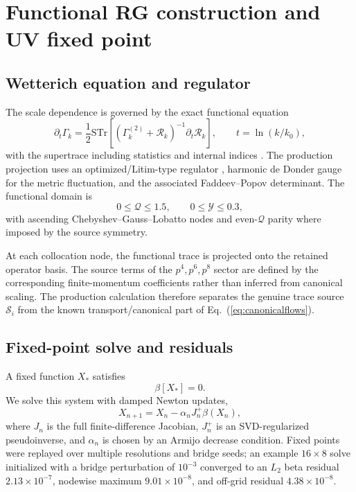 \documentclass[12pt]{iopart}
\newcommand{\STr}{\mathrm{STr}}
\newcommand{\cR}{\mathcal R}
\newcommand{\cS}{\mathcal S}
\newcommand{\Q}{\mathcal Q}
\newcommand{\Y}{\mathcal Y}
\begin{document}
\section{Functional RG construction and UV fixed point}
\label{sec:frg}

\subsection{Wetterich equation and regulator}

The scale dependence is governed by the exact functional equation
\begin{equation}
\partial_t\Gamma_k=\frac12\STr\left[
\left(\Gamma_k^{(2)}+\cR_k\right)^{-1}\partial_t\cR_k
\right],\qquad t=\ln(k/k_0),
\label{eq:wetterich}
\end{equation}
with the supertrace including statistics and internal indices \cite{Wetterich1993,Reuter1998,Saueressig2023}.  The production projection uses an optimized/Litim-type regulator \cite{Litim2001}, harmonic de Donder gauge for the metric fluctuation, and the associated Faddeev--Popov determinant.  The functional domain is
\begin{equation}
0\le \Q\le1.5,\qquad 0\le\Y\le0.3,
\end{equation}
with ascending Chebyshev--Gauss--Lobatto nodes and even-$\Q$ parity where imposed by the source symmetry.

At each collocation node, the functional trace is projected onto the retained operator basis.  The source terms of the $p^4,p^6,p^8$ sector are defined by the corresponding finite-momentum coefficients rather than inferred from canonical scaling.  The production calculation therefore separates the genuine trace source $\cS_i$ from the known transport/canonical part of Eq.~(\ref{eq:canonicalflows}).

\subsection{Fixed-point solve and residuals}

A fixed function $X_*$ satisfies
\begin{equation}
\beta[X_*]=0.
\end{equation}
We solve this system with damped Newton updates,
\begin{equation}
X_{n+1}=X_n-\alpha_n J_n^+\beta(X_n),
\end{equation}
where $J_n$ is the full finite-difference Jacobian, $J_n^+$ is an SVD-regularized pseudoinverse, and $\alpha_n$ is chosen by an Armijo decrease condition.  Fixed points were replayed over multiple resolutions and bridge seeds; an example $16\times8$ solve initialized with a bridge perturbation of $10^{-3}$ converged to an $L_2$ beta residual $2.13\times10^{-7}$, nodewise maximum $9.01\times10^{-8}$, and off-grid residual $4.38\times10^{-8}$.
\end{document}
